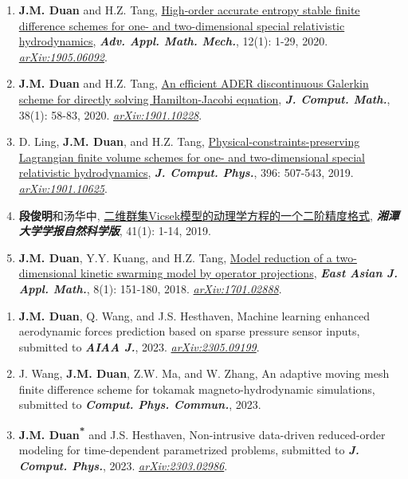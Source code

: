 \begin{enumerate}
%
\item[\circenum] {\bfseries J.M. Duan} and H.Z. Tang, \href{https://doi.org/10.4208/aamm.OA-2019-0124}{High-order accurate entropy stable finite difference schemes for one- and two-dimensional special relativistic hydrodynamics}, {\em\bfseries Adv. Appl. Math. Mech.}, 12(1): 1-29, 2020. \href{https://arxiv.org/abs/1905.06092}{\em arXiv:1905.06092}.
%
\item[\circenum] {\bfseries J.M. Duan} and H.Z. Tang, \href{https://doi.org/10.4208/jcm.1902-m2018-0189}{An efficient ADER discontinuous Galerkin scheme for directly solving Hamilton-Jacobi equation}, {\em\bfseries J. Comput. Math.}, 38(1): 58-83, 2020. \href{https://arxiv.org/abs/1901.10228}{\em arXiv:1901.10228}.
%
\item[\circenum] D. Ling, {\bfseries J.M. Duan}, and H.Z. Tang, \href{https://doi.org/10.1016/j.jcp.2019.06.055}{Physical-constraints-preserving Lagrangian finite volume schemes for one- and two-dimensional special relativistic hydrodynamics}, {\em\bfseries J. Comput. Phys.}, 396: 507-543, 2019. \href{https://arxiv.org/abs/1901.10625}{\em arXiv:1901.10625}.
%
\item[\circenum] {\bfseries 段俊明}和汤华中, \href{http://www.jxtu.net/xtdxxbzr/ch/reader/view_abstract.aspx?file_no=201901001&flag=1}{二维群集Vicsek模型的动理学方程的一个二阶精度格式}, {\em\bfseries 湘潭大学学报自然科学版}, 41(1): 1-14, 2019.%
\item[\circenum] {\bfseries J.M. Duan}, Y.Y. Kuang, and H.Z. Tang, \href{https://doi.org/10.4208/eajam.170617.141117a}{Model reduction of a two-dimensional kinetic swarming model by operator projections}, {\em\bfseries East Asian J. Appl. Math.}, 8(1): 151-180, 2018. \href{https://arxiv.org/abs/1701.02888}{\em arXiv:1701.02888}.
\end{enumerate}

\begin{enumerate}
%
\item[\circenum] {\bfseries J.M. Duan}, Q. Wang, and J.S. Hesthaven, Machine learning enhanced aerodynamic forces prediction based on sparse pressure sensor inputs, submitted to {\em\bfseries AIAA J.}, 2023. \href{https://arxiv.org/abs/2305.09199}{\em arXiv:2305.09199}.
%
\item[\circenum] J. Wang, {\bfseries J.M. Duan}, Z.W. Ma, and W. Zhang, An adaptive moving mesh finite difference scheme for tokamak magneto-hydrodynamic simulations, submitted to {\em\bfseries Comput. Phys. Commun.}, 2023.
%
\item[\circenum] {\bfseries J.M. Duan\textsuperscript{*}} and J.S. Hesthaven, Non-intrusive data-driven reduced-order modeling for time-dependent parametrized problems, submitted to {\em\bfseries J. Comput. Phys.}, 2023. \href{https://arxiv.org/abs/2303.02986}{\em arXiv:2303.02986}.
\end{enumerate}
